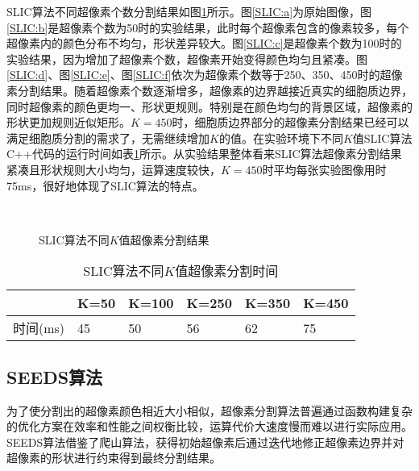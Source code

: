 \documentclass[nomlist,masters]{seuthesix}
\begin{document}
SLIC算法不同超像素个数分割结果如图\ref{SLIC}所示。图\ref{SLIC:a}为原始图像，图\ref{SLIC:b}是超像素个数为50时的实验结果，此时每个超像素包含的像素较多，每个超像素内的颜色分布不均匀，形状差异较大。图\ref{SLIC:c}是超像素个数为100时的实验结果，因为增加了超像素个数，超像素开始变得颜色均匀且紧凑。图\ref{SLIC:d}、图\ref{SLIC:e}、图\ref{SLIC:f}依次为超像素个数等于250、350、450时的超像素分割结果。随着超像素个数逐渐增多，超像素的边界越接近真实的细胞质边界，同时超像素的颜色更均一、形状更规则。特别是在颜色均匀的背景区域，超像素的形状更加规则近似矩形。$K=450$时，细胞质边界部分的超像素分割结果已经可以满足细胞质分割的需求了，无需继续增加$K$的值。在实验环境下不同$K$值SLIC算法C++代码的运行时间如表\ref{SLICtime}所示。从实验结果整体看来SLIC算法超像素分割结果紧凑且形状规则大小均匀，运算速度较快，$K=450$时平均每张实验图像用时75ms，很好地体现了SLIC算法的特点。
\begin{figure}[H]
\centering 
\hspace{0.01\textwidth}
\hspace{0.01\textwidth} 
\vfill
\centering
{}
\hspace{0.01\textwidth} 
\hspace{0.01\textwidth}
\caption{SLIC算法不同$K$值超像素分割结果}
\label{SLIC}
\end{figure}

\begin{table}[H]
\centering
\caption{SLIC算法不同$K$值超像素分割时间\label{SLICtime}}
\begin{tabular}{|p{2cm}<{\centering}|p{2cm}<{\centering}|p{2cm}<{\centering}|p{2cm}<{\centering}|p{2cm}<{\centering}|p{2cm}<{\centering}|}
\hline
 & K=50 & K=100 & K=250 & K=350 & K=450\\
\hline
时间(ms) & 45 & 50 & 56 & 62 & 75\\
\hline
\end{tabular}
\end{table}


\subsection{SEEDS算法}
为了使分割出的超像素颜色相近大小相似，超像素分割算法普遍通过函数构建复杂的优化方案在效率和性能之间权衡比较，运算代价大速度慢而难以进行实际应用。SEEDS算法借鉴了爬山算法，获得初始超像素后通过迭代地修正超像素边界并对超像素的形状进行约束得到最终分割结果。
\end{document}
